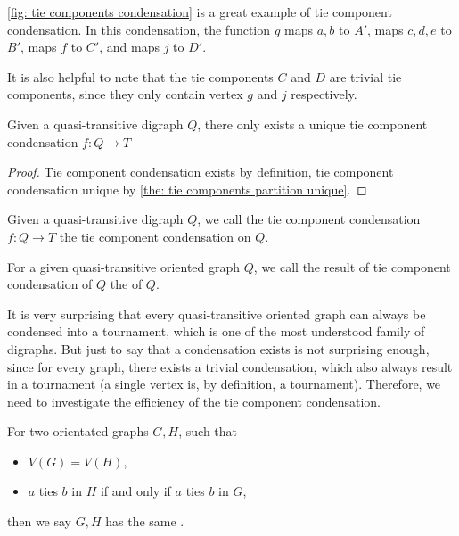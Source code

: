 \cref{fig: tie components condensation} is a great example of
tie component condensation.
In this condensation, the function \(g\) maps \(a, b\) to \(A'\),
maps \(c, d, e\) to \(B'\), maps \(f\) to \(C'\),
and maps \(j\) to \(D'\).

It is also helpful to note that the tie components \(C\) and \(D\)
are trivial tie components,
since they only contain vertex \(g\) and \(j\) respectively.

\begin{corollary}
  Given a quasi-transitive digraph \(Q\),
  there only exists a unique tie component condensation
  \(f: Q \to T\)
\end{corollary}
\begin{proof}
  Tie component condensation exists by definition,
  tie component condensation unique
  by \cref{the: tie components partition unique}.
\end{proof}

\begin{definition}
  Given a quasi-transitive digraph \(Q\),
  we call the tie component condensation \(f: Q \to T\)
  the tie component condensation on \(Q\).
\end{definition}

\begin{definition}
  For a given quasi-transitive oriented graph \(Q\),
  we call the result of tie component condensation of \(Q\)
  the  of \(Q\).
\end{definition}

It is very surprising that every
quasi-transitive oriented graph
can always be condensed into a tournament,
which is one of the most understood family of digraphs.
But just to say that a condensation exists is not surprising enough,
since for every graph, there exists a trivial condensation,
which also always result in a tournament
(a single vertex is, by definition, a tournament).
Therefore, we need to investigate the efficiency of the tie
component condensation.

\begin{definition}
  For two orientated graphs \(G, H\), such that
  \begin{itemize}
    \item \(V(G) = V(H)\),
    \item \(a\) ties \(b\) in \(H\) if and only if
      \(a\) ties \(b\) in \(G\),
  \end{itemize}
  then we say \(G, H\) has the same .
\end{definition}

